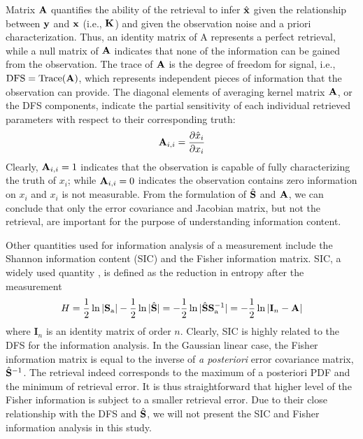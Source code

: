 Matrix $\mathbf{A}$ quantifies the ability of the retrieval to infer
$\hat{\mathbf{x}}$ given the relationship between $\mathbf{y}$ and $\mathbf{x}$ (i.e.,
$\mathbf{K}$) and given the observation noise and a priori characterization. 
Thus, an identity matrix of A represents a perfect retrieval, 
while a null matrix of $\mathbf{A}$ indicates that none of the
information can be gained from the observation. The trace of $\mathbf{A}$ is the
degree of freedom for signal, i.e., $\text{DFS}=\text{Trace}(\mathbf{A})$, 
which represents independent pieces of information that the observation 
can provide. The diagonal elements of averaging kernel matrix $\mathbf{A}$, 
or the DFS components, indicate the partial sensitivity of each 
individual retrieved parameters with respect to their corresponding truth: 
\begin{equation}
\mathbf{A}_{i,i}=\frac{\partial\hat{x}_i}{\partial x_i}
\end{equation}
Clearly, $\mathbf{A}_{i,i}=1$ indicates that the observation is capable
of fully characterizing the truth of $x_i$; while $\mathbf{A}_{i,i}=0$ 
indicates the observation contains zero information on $x_i$ and $x_i$ 
is not measurable. From the formulation of $\hat{\mathbf{S}}$ and $\mathbf{A}$, 
we can conclude that only the error covariance and Jacobian matrix, 
but not the retrieval, are important for the purpose of understanding 
information content.

Other quantities used for information analysis of a measurement include
the Shannon information content (SIC) \citep{Shannon48} and the Fisher
information matrix. SIC, a widely used quantity \citep[e.g.,][]{Rodgers98,
Knobelspiesse12}, is defined as the reduction in entropy after 
the measurement
\begin{equation}
H=\frac{1}{2}\ln{|\mathbf{S}_\text{a}|}-\frac{1}{2}\ln{|\hat{\mathbf{S}}|}
 =-\frac{1}{2}\ln{|\hat{\mathbf{S}}\mathbf{S}_\text{a}^{-1}|}
 =-\frac{1}{2}\ln{|\mathbf{I}_n-\mathbf{A}|}
\end{equation}
where $\mathbf{I}_n$ is an identity matrix of order $n$. Clearly, 
SIC is highly related to the DFS for the information analysis. 
In the Gaussian linear case, the Fisher information matrix is equal 
to the inverse of \textit{a posteriori} error covariance matrix, 
$\hat{\mathbf{S}}^{-1}$. The retrieval indeed corresponds to the maximum 
of a posteriori PDF and the minimum of retrieval error. It is thus 
straightforward that higher level of the Fisher information is 
subject to a smaller retrieval error. Due to their close 
relationship with the DFS and $\hat{\mathbf{S}}$, we will not present 
the SIC and Fisher information analysis in this study. 

